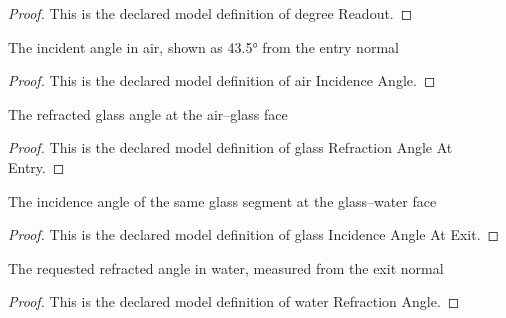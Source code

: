 \begin{proof}
  This is the declared model definition of degree Readout.
\end{proof}
\begin{definition}
  \label{def:physics:phyx-mini-0143:phyxminiproblems-problemphyxmini0143-airincidenceangle}
  The incident angle in air, shown as 43.5° from the entry normal
\end{definition}
\begin{proof}
  This is the declared model definition of air Incidence Angle.
\end{proof}
\begin{definition}
  \label{def:physics:phyx-mini-0143:phyxminiproblems-problemphyxmini0143-glassrefractionangleatentry}
  The refracted glass angle at the air--glass face
\end{definition}
\begin{proof}
  This is the declared model definition of glass Refraction Angle At Entry.
\end{proof}
\begin{definition}
  \label{def:physics:phyx-mini-0143:phyxminiproblems-problemphyxmini0143-glassincidenceangleatexit}
  The incidence angle of the same glass segment at the glass--water face
\end{definition}
\begin{proof}
  This is the declared model definition of glass Incidence Angle At Exit.
\end{proof}
\begin{definition}
  \label{def:physics:phyx-mini-0143:phyxminiproblems-problemphyxmini0143-waterrefractionangle}
  The requested refracted angle in water, measured from the exit normal
\end{definition}
\begin{proof}
  This is the declared model definition of water Refraction Angle.
\end{proof}
